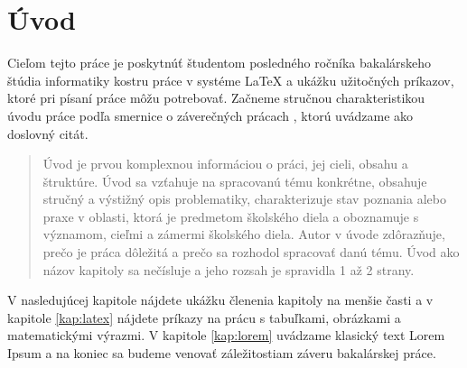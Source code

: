 \chapter*{Úvod} %

Cieľom tejto práce je poskytnúť študentom posledného ročníka
bakalárskeho štúdia informatiky kostru práce v systéme LaTeX a ukážku
užitočných príkazov, ktoré pri písaní práce môžu potrebovať. Začneme
stručnou charakteristikou úvodu práce podľa smernice o záverečných
prácach \cite{smernica}, ktorú uvádzame ako doslovný citát.

\begin{quote}
Úvod je prvou komplexnou informáciou o práci, jej cieli, obsahu a štruktúre. Úvod sa 
vzťahuje na spracovanú tému konkrétne, obsahuje stručný a výstižný opis 
problematiky, charakterizuje stav poznania alebo praxe v oblasti, ktorá je predmetom 
školského diela a oboznamuje s významom, cieľmi a zámermi školského diela. Autor 
v úvode zdôrazňuje, prečo je práca dôležitá a prečo sa rozhodol spracovať danú tému. 
Úvod ako názov kapitoly sa nečísluje a jeho rozsah je spravidla 1 až 2 strany.
\end{quote}

V nasledujúcej kapitole nájdete ukážku členenia kapitoly na menšie
časti a v kapitole \ref{kap:latex} nájdete príkazy na prácu s
tabuľkami, obrázkami a matematickými výrazmi. V kapitole
\ref{kap:lorem} uvádzame klasický text Lorem Ipsum a na koniec sa
budeme venovať záležitostiam záveru bakalárskej práce. 

